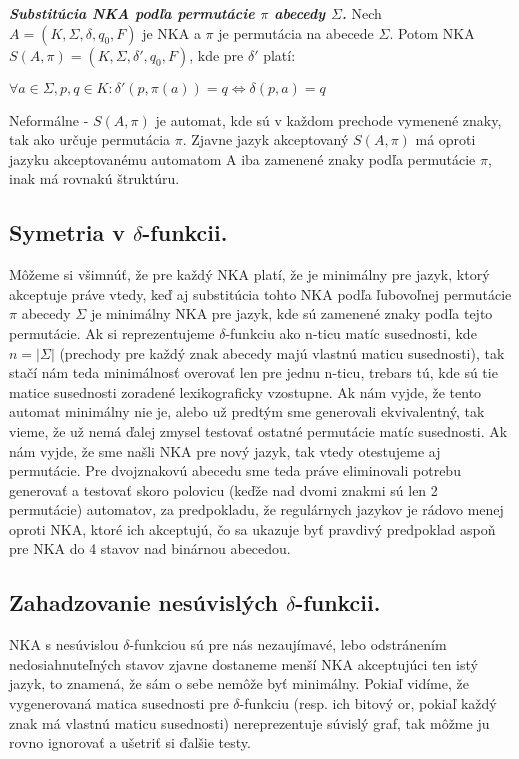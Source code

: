 \begin{defn}{\textbf {\textit {Substitúcia NKA podľa permutácie $\pi$ abecedy $\Sigma$.}}} Nech $A = (K,\Sigma,\delta,q_0,F)$ je NKA a $\pi$ je permutácia na abecede $\Sigma$. Potom NKA $S(A,\pi)=(K,\Sigma,\delta',q_0,F)$, kde pre $\delta'$ platí:
\\
\centerline{$\forall a\in \Sigma, p,q \in K: \delta'(p,\pi(a)) = q \Longleftrightarrow \delta(p,a) = q$}
\end{defn}
Neformálne - $S(A,\pi)$ je  automat, kde sú v každom prechode vymenené znaky, tak ako určuje permutácia $\pi$. Zjavne jazyk akceptovaný $S(A,\pi)$ má oproti jazyku akceptovanému automatom A iba zamenené znaky podľa permutácie $\pi$, inak má rovnakú štruktúru.


\subsection{Symetria v $\delta$-funkcii.} Môžeme si všimnúť, že pre každý NKA platí, že je minimálny pre jazyk, ktorý akceptuje práve vtedy, keď aj substitúcia tohto NKA podľa ľubovoľnej permutácie $\pi$ abecedy $\Sigma$ je minimálny NKA pre jazyk, kde sú zamenené znaky podľa tejto permutácie. Ak si reprezentujeme $\delta$-funkciu ako n-ticu matíc susednosti, kde $n=|\Sigma|$ (prechody pre každý znak abecedy majú vlastnú maticu susednosti), tak stačí nám teda minimálnosť overovať len pre jednu n-ticu, trebars tú, kde sú tie matice susednosti zoradené lexikograficky vzostupne. Ak nám vyjde, že tento automat minimálny nie je, alebo už predtým sme generovali ekvivalentný, tak vieme, že už nemá ďalej zmysel testovať ostatné permutácie matíc susednosti. Ak nám vyjde, že sme našli NKA pre nový jazyk, tak vtedy otestujeme aj permutácie. Pre dvojznakovú abecedu sme teda práve eliminovali potrebu generovať a testovať skoro polovicu (keďže nad dvomi znakmi sú len 2 permutácie) automatov, za predpokladu, že regulárnych jazykov je rádovo menej oproti NKA, ktoré ich akceptujú, čo sa ukazuje byť pravdivý predpoklad aspoň pre NKA do 4 stavov nad binárnou abecedou.    


\subsection{Zahadzovanie nesúvislých $\delta$-funkcii.} NKA s nesúvislou $\delta$-funkciou sú pre nás nezaujímavé, lebo odstránením nedosiahnuteľných stavov zjavne dostaneme menší NKA akceptujúci ten istý jazyk, to znamená, že sám o sebe nemôže byť minimálny. Pokiaľ vidíme, že vygenerovaná matica susednosti pre $\delta$-funkciu (resp. ich bitový or, pokiaľ každý znak má vlastnú maticu susednosti) nereprezentuje súvislý graf, tak môžme ju rovno ignorovať a ušetriť si ďalšie testy.   



